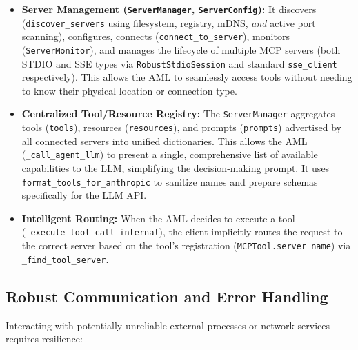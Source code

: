 \documentclass[12pt,a4paper]{article}
\newcommand{\code}[1]{\nolinkurl{#1}}
\begin{document}
\begin{itemize}
    \item \textbf{Server Management (\code{ServerManager}, \code{ServerConfig}):} It discovers (\code{discover\_servers} using filesystem, registry, mDNS, \textit{and} active port scanning), configures, connects (\code{connect\_to\_server}), monitors (\code{ServerMonitor}), and manages the lifecycle of multiple MCP servers (both STDIO and SSE types via \code{RobustStdioSession} and standard \code{sse\_client} respectively). This allows the AML to seamlessly access tools without needing to know their physical location or connection type.

    \item \textbf{Centralized Tool/Resource Registry:} The \code{ServerManager} aggregates tools (\code{tools}), resources (\code{resources}), and prompts (\code{prompts}) advertised by all connected servers into unified dictionaries. This allows the AML (\code{\_call\_agent\_llm}) to present a single, comprehensive list of available capabilities to the LLM, simplifying the decision-making prompt. It uses \code{format\_tools\_for\_anthropic} to sanitize names and prepare schemas specifically for the LLM API.

    \item \textbf{Intelligent Routing:} When the AML decides to execute a tool (\code{\_execute\_tool\_call\_internal}), the client implicitly routes the request to the correct server based on the tool's registration (\code{MCPTool.server\_name}) via \code{\_find\_tool\_server}.
\end{itemize}

\subsection{Robust Communication and Error Handling}

Interacting with potentially unreliable external processes or network services requires resilience:
\end{document}
